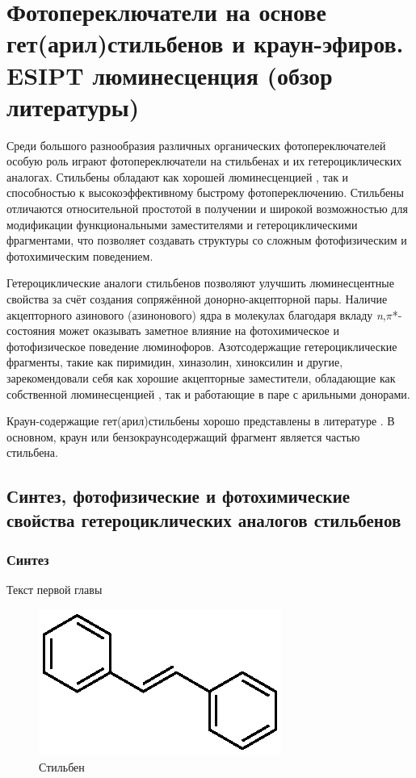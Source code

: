 \chapter{Фотопереключатели на основе гет(арил)стильбенов и краун-эфиров. ESIPT люминесценция (обзор литературы)} \label{chapt1}

	Среди большого разнообразия различных органических фотопереключателей особую роль играют фотопереключатели на стильбенах и их гетероциклических аналогах. Стильбены обладают как хорошей люминесценцией \cite{Krasovitsky_Bolotin}, так и способностью к высокоэффективному быстрому фотопереключению. Стильбены отличаются относительной простотой в получении \cite{Wood1941} и широкой возможностью для модификации функциональными заместителями и гетероциклическими фрагментами, что позволяет создавать структуры со сложным фотофизическим и фотохимическим поведением. \cite{Waldeck_D_H1991_Stilbenes} 
	
	Гетероциклические аналоги стильбенов позволяют улучшить люминесцентные свойства за счёт создания сопряжённой донорно-акцепторной пары. Наличие акцепторного азинового (азинонового) ядра в молекулах благодаря вкладу \textit{n},$\pi$*-состояния может оказывать заметное влияние на фотохимическое и фотофизическое поведение люминофоров. \cite{Lower1966} Азотсодержащие гетероциклические фрагменты, такие как пиримидин, хиназолин, хиноксилин и другие, зарекомендовали себя как хорошие акцепторные заместители, обладающие как собственной люминесценцией \cite{Krasovitsky_Bolotin}, так и работающие в паре с арильными донорами.
	
	Краун-содержащие гет(арил)стильбены хорошо представлены в литературе \cite{Gromov_2006_Crowns_in_Stilbenes}. В основном, краун или бензокраунсодержащий фрагмент является частью стильбена. 

	\section{Синтез, фотофизические и фотохимические свойства гетероциклических аналогов стильбенов}\label{sect1_1}
	
		\subsection{Синтез}
	
			Текст первой главы
		
			\begin{figure}
				\centering
				\caption{Стильбен}
				\label{fig:stilbene}
				\includegraphics{Dissertation/images/part1/Stilbene}
			\end{figure}
			
			